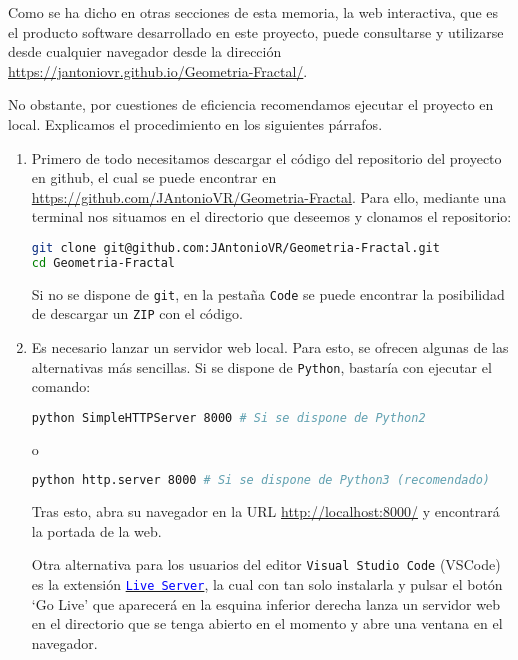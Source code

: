 Como se ha dicho en otras secciones de esta memoria, la web interactiva, que es el producto software desarrollado en este proyecto, puede consultarse y utilizarse desde cualquier navegador desde la dirección \url{https://jantoniovr.github.io/Geometria-Fractal/}.

No obstante, por cuestiones de eficiencia recomendamos ejecutar el
proyecto en local. Explicamos el procedimiento en los siguientes
párrafos.

\begin{enumerate}
\def\labelenumi{\arabic{enumi}.}
\item
  Primero de todo necesitamos descargar el código del repositorio del proyecto en github, el cual se puede encontrar en \url{https://github.com/JAntonioVR/Geometria-Fractal}. Para ello, mediante una terminal nos situamos en el directorio que deseemos y clonamos el repositorio:

  \begin{lstlisting}[language=bash]
git clone git@github.com:JAntonioVR/Geometria-Fractal.git
cd Geometria-Fractal
  \end{lstlisting}

  Si no se dispone de \texttt{git}, en la pestaña \texttt{Code} se puede encontrar la posibilidad de descargar un \texttt{ZIP} con el código.

\item
  Es necesario lanzar un servidor web local. Para esto, se ofrecen algunas de las alternativas más sencillas. Si se dispone de
  \texttt{Python}, bastaría con ejecutar el comando:

  \begin{lstlisting}[language=bash]
python SimpleHTTPServer 8000 # Si se dispone de Python2
  \end{lstlisting}

  o

  \begin{lstlisting}[language=bash]
python http.server 8000 # Si se dispone de Python3 (recomendado)
  \end{lstlisting}
  
  Tras esto, abra su navegador en la URL \url{http://localhost:8000/} y encontrará la portada de la web.

  Otra alternativa para los usuarios del editor \texttt{Visual\ Studio\ Code} (VSCode) es la extensión \href{https://marketplace.visualstudio.com/items?itemName=ritwickdey.LiveServer}{\textcolor{blue}{\texttt{Live\ Server}}}, la cual con tan solo instalarla y pulsar el botón `Go Live' que aparecerá en la esquina inferior derecha lanza un servidor web en el directorio que se tenga abierto en el momento y abre una ventana en el navegador.


\end{enumerate}
